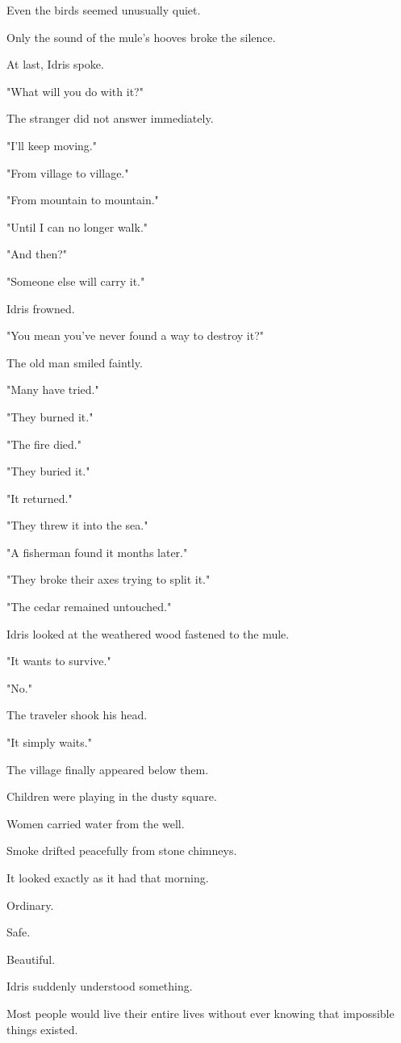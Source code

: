 \documentclass[12pt,openany]{book}
\begin{document}
Even the birds seemed unusually quiet.

Only the sound of the mule's hooves broke the silence.

At last, Idris spoke.

"What will you do with it?"

The stranger did not answer immediately.

"I'll keep moving."

"From village to village."

"From mountain to mountain."

"Until I can no longer walk."

"And then?"

"Someone else will carry it."

Idris frowned.

"You mean you've never found a way to destroy it?"

The old man smiled faintly.

"Many have tried."

"They burned it."

"The fire died."

"They buried it."

"It returned."

"They threw it into the sea."

"A fisherman found it months later."

"They broke their axes trying to split it."

"The cedar remained untouched."

Idris looked at the weathered wood fastened to the mule.

"It wants to survive."

"No."

The traveler shook his head.

"It simply waits."

The village finally appeared below them.

Children were playing in the dusty square.

Women carried water from the well.

Smoke drifted peacefully from stone chimneys.

It looked exactly as it had that morning.

Ordinary.

Safe.

Beautiful.

Idris suddenly understood something.

Most people would live their entire lives without ever knowing that impossible things existed.
\end{document}
